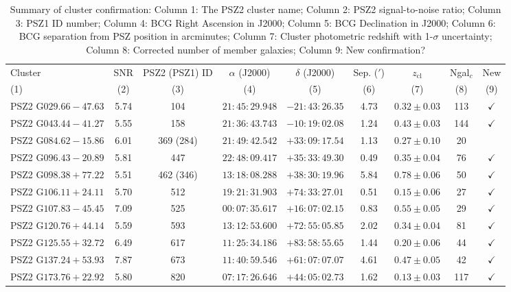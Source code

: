 \documentclass[apj, revtex4-1]{emulateapj}
\begin{document}
\begin{table}
	\caption[Summary of Cluster Confirmation]{Summary of cluster confirmation: Column 1: The PSZ2 cluster name; Column 2: PSZ2 signal-to-noise ratio; Column 3: PSZ1 ID number; Column 4: BCG Right Ascension in J2000; Column 5: BCG Declination in J2000; Column 6: BCG separation from PSZ position in arcminutes; Column 7: Cluster photometric redshift with 1-$\sigma$ uncertainty; Column 8: Corrected number of member galaxies; Column 9: New confirmation? }
	\centering
	\begin{tabular}{lcccccccc}
	\hline
	Cluster & SNR & PSZ2 (PSZ1) ID & $\alpha$ (J2000) & $\delta$ (J2000) & Sep. ($'$) & $z_\mathrm{cl}$ & Ngal$_c$ & New\\
	(1) & (2) & (3) & (4) & (5) & (6) & (7) & (8) & (9) \\
	\hline
	 PSZ2 G$029.66-47.63$ & 5.74 & 104 & $21:45:29.948$ &  $-21:43:26.35$ & 4.73 & $0.32 \pm 0.03$ & 113 & $\checkmark$ \\
	 PSZ2 G$043.44-41.27$ & 5.55 & 158 & $21:36:43.743$ &  $-10:19:02.08$ & 1.24 & $0.43 \pm 0.03$ & 144 & $\checkmark$ \\
	 PSZ2 G$084.62-15.86$ & 6.01 & 369 (284) & $21:49:42.542$ &  $+33:09:17.54$ & 1.13 & $0.27 \pm 0.10$ & 20 & \\
	 PSZ2 G$096.43-20.89$ & 5.81 & 447 & $22:48:09.417$ &  $+35:33:49.30$ & 0.49 & $0.35 \pm 0.04$ & 76 & $\checkmark$ \\
	 PSZ2 G$098.38+77.22$ & 5.51 & 462 (346) & $13:18:08.288$ &  $+38:30:19.96$ & 5.84 & $0.78 \pm 0.06$ & 50 & $\checkmark$ \\
	 PSZ2 G$106.11+24.11$ & 5.70 & 512 & $19:21:31.903$ &  $+74:33:27.01$ & 0.51 & $0.15 \pm 0.06$ & 27 & $\checkmark$ \\
	 PSZ2 G$107.83-45.45$ & 7.09 & 525 & $00:07:35.617$ &  $+16:07:02.15$ & 0.83 & $0.55 \pm 0.05$ & 29 & $\checkmark$ \\
	 PSZ2 G$120.76+44.14$ & 5.59 & 593 & $13:12:53.600$ &  $+72:55:05.85$ & 2.02 & $0.34 \pm 0.04$ & 81 & $\checkmark$ \\
	 PSZ2 G$125.55+32.72$ & 6.49 & 617 & $11:25:34.186$ &  $+83:58:55.65$ & 1.44 & $0.20 \pm 0.06$ & 44 & $\checkmark$ \\
	 PSZ2 G$137.24+53.93$ & 7.87 & 673 & $11:40:59.546$ &  $+61:07:07.07$ & 4.61 & $0.47 \pm 0.05$ & 42 & $\checkmark$ \\
	 PSZ2 G$173.76+22.92$ & 5.80 & 820 & $07:17:26.646$ &  $+44:05:02.73$ & 1.62 & $0.13 \pm 0.03$ & 117 & $\checkmark$ \\

\end{tabular}
\end{table}
\end{document}

